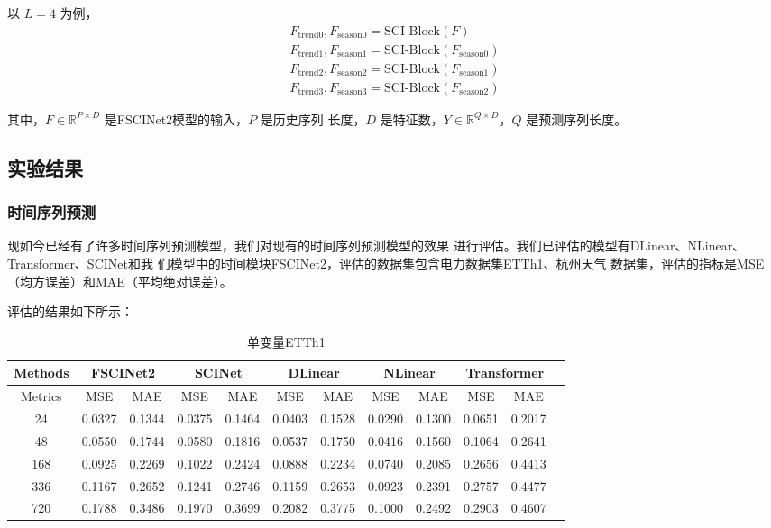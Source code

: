 \documentclass[twoside,a4paper]{article}
\begin{document}
\begin{CJK*}{UTF8}{gkai}
以 $L=4$ 为例，
\begin{gather}
  F_{\text{trend0}}, F_{\text{season0}} = \text{SCI-Block}(F)\\
F_{\text{trend1}}, F_{\text{season1}} = \text{SCI-Block}(F_{\text{season0}})\\
F_{\text{trend2}}, F_{\text{season2}} = \text{SCI-Block}(F_{\text{season1}})\\
F_{\text{trend3}}, F_{\text{season3}} = \text{SCI-Block}(F_{\text{season2}})
\end{gather}

其中，$F\in\mathbb R^{P\times D}$ 是FSCINet2模型的输入，$P$ 是历史序列
长度，$D$ 是特征数，$Y\in\mathbb R^{Q\times D}$，$Q$ 是预测序列长度。


\subsection{实验结果}
\subsubsection*{时间序列预测}
现如今已经有了许多时间序列预测模型，我们对现有的时间序列预测模型的效果
进行评估。我们已评估的模型有DLinear、NLinear、Transformer、SCINet和我
们模型中的时间模块FSCINet2，评估的数据集包含电力数据集ETTh1、杭州天气
数据集，评估的指标是MSE（均方误差）和MAE（平均绝对误差）。


评估的结果如下所示：
\begin{table}[H]
  \centering
  \caption{单变量ETTh1}
  \begin{tabular}{c c c c c c c c c c c c}
    \hline
    \textbf{Methods} & \multicolumn{2}{c}{FSCINet2}& \multicolumn{2}{c}{SCINet} & \multicolumn{2}{c}{DLinear}
    &\multicolumn{2}{c}{NLinear} &\multicolumn{2}{c}{Transformer}\\
    \hline
    Metrics & MSE & MAE & MSE & MAE & MSE & MAE &MSE & MAE & MSE & MAE \\
    \hline\hline
     24  & 0.0327 & 0.1344 & 0.0375 & 0.1464 & 0.0403 & 0.1528 & 0.0290 & 0.1300 & 0.0651 & 0.2017 \\
     48  & 0.0550 & 0.1744 & 0.0580 & 0.1816 & 0.0537 & 0.1750 & 0.0416 & 0.1560 & 0.1064 & 0.2641 \\
     168 & 0.0925 & 0.2269 & 0.1022 & 0.2424 & 0.0888 & 0.2234 & 0.0740 & 0.2085 & 0.2656 & 0.4413 \\
     336 & 0.1167 & 0.2652 & 0.1241 & 0.2746 & 0.1159 & 0.2653 & 0.0923 & 0.2391 & 0.2757 & 0.4477 \\
     720 & 0.1788 & 0.3486 & 0.1970 & 0.3699 & 0.2082 & 0.3775 & 0.1000 & 0.2492 & 0.2903 & 0.4607 \\
    \hline\hline
  \end{tabular}
  \label{tab:pro_pro}
\end{table}


\end{CJK*}
\end{document}
